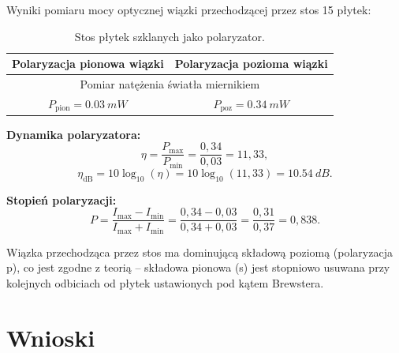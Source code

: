 \documentclass[a4paper,12pt]{article}
\begin{document}
Wyniki pomiaru mocy optycznej wiązki przechodzącej przez stos 15 płytek:

\begin{table}[H]
\centering
\caption{Stos płytek szklanych jako polaryzator.}
\renewcommand{\arraystretch}{1.3}
\begin{tabular}{cc}
\toprule
Polaryzacja pionowa wiązki & Polaryzacja pozioma wiązki \\
\midrule
\multicolumn{2}{c}{Pomiar natężenia światła miernikiem} \\
\midrule
$P_{\text{pion}} = \SI{0,03}{mW}$ & $P_{\text{poz}} = \SI{0,34}{mW}$ \\
\bottomrule
\end{tabular}
\end{table}

\textbf{Dynamika polaryzatora:}
\[
\eta = \frac{P_{\max}}{P_{\min}} = \frac{0{,}34}{0{,}03} = 11{,}33,
\]
\[
\eta_{\text{dB}} = 10\log_{10}(\eta) = 10\log_{10}(11{,}33) = \SI{10,54}{dB}.
\]

\textbf{Stopień polaryzacji:}
\[
P = \frac{I_{\max} - I_{\min}}{I_{\max} + I_{\min}}
= \frac{0{,}34 - 0{,}03}{0{,}34 + 0{,}03}
= \frac{0{,}31}{0{,}37} = 0{,}838.
\]

Wiązka przechodząca przez stos ma dominującą składową poziomą (polaryzacja p), co jest
zgodne z teorią -- składowa pionowa (s) jest stopniowo usuwana przy kolejnych odbiciach
od płytek ustawionych pod kątem Brewstera.

\section*{Wnioski}
\end{document}
